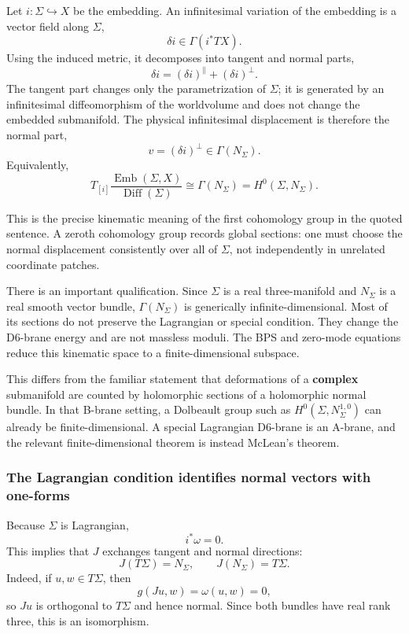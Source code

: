 \documentclass[
  10pt,
  a4paper,
  openany]{book}
\begin{document}
Let \(i:\Sigma\hookrightarrow X\) be the embedding. An infinitesimal
variation of the embedding is a vector field along \(\Sigma\), \[
\delta i\in\Gamma(i^*TX).
\] Using the induced metric, it decomposes into tangent and normal
parts, \[
\delta i=(\delta i)^\parallel+(\delta i)^\perp.
\] The tangent part changes only the parametrization of \(\Sigma\); it
is generated by an infinitesimal diffeomorphism of the worldvolume and
does not change the embedded submanifold. The physical infinitesimal
displacement is therefore the normal part, \[
v=(\delta i)^\perp\in\Gamma(N_\Sigma).
\] Equivalently, \[
T_{[i]}\frac{\operatorname{Emb}(\Sigma,X)}{\operatorname{Diff}(\Sigma)}
\cong
\Gamma(N_\Sigma)
=H^0(\Sigma,N_\Sigma).
\]

This is the precise kinematic meaning of the first cohomology group in
the quoted sentence. A zeroth cohomology group records global sections:
one must choose the normal displacement consistently over all of
\(\Sigma\), not independently in unrelated coordinate patches.

There is an important qualification. Since \(\Sigma\) is a real
three-manifold and \(N_\Sigma\) is a real smooth vector bundle,
\(\Gamma(N_\Sigma)\) is generically infinite-dimensional. Most of its
sections do not preserve the Lagrangian or special condition. They
change the D6-brane energy and are not massless moduli. The BPS and
zero-mode equations reduce this kinematic space to a finite-dimensional
subspace.

This differs from the familiar statement that deformations of a
\textbf{complex} submanifold are counted by holomorphic sections of a
holomorphic normal bundle. In that B-brane setting, a Dolbeault group
such as \(H^0(\Sigma,N^{1,0}_\Sigma)\) can already be
finite-dimensional. A special Lagrangian D6-brane is an A-brane, and the
relevant finite-dimensional theorem is instead McLean's theorem.

\subsubsection{The Lagrangian condition identifies normal vectors with
one-forms}\label{the-lagrangian-condition-identifies-normal-vectors-with-one-forms}

Because \(\Sigma\) is Lagrangian, \[
i^*\omega=0.
\] This implies that \(J\) exchanges tangent and normal directions: \[
J(T\Sigma)=N_\Sigma,
\qquad
J(N_\Sigma)=T\Sigma.
\] Indeed, if \(u,w\in T\Sigma\), then \[
g(Ju,w)=\omega(u,w)=0,
\] so \(Ju\) is orthogonal to \(T\Sigma\) and hence normal. Since both
bundles have real rank three, this is an isomorphism.
\end{document}
